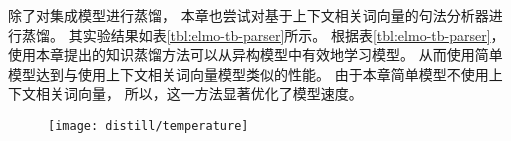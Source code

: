 除了对集成模型进行蒸馏，
本章也尝试对基于上下文相关词向量的句法分析器进行蒸馏。
其实验结果如表\ref{tbl:elmo-tb-parser}所示。
根据表\ref{tbl:elmo-tb-parser}，
使用本章提出的知识蒸馏方法可以从异构模型中有效地学习模型。
从而使用简单模型达到与使用上下文相关词向量模型类似的性能。
由于本章简单模型不使用上下文相关词向量，
所以，这一方法显著优化了模型速度。

%
%
%
\begin{figure}[t]
	\centering
	\texttt{[image: distill/temperature]}
\end{figure}
